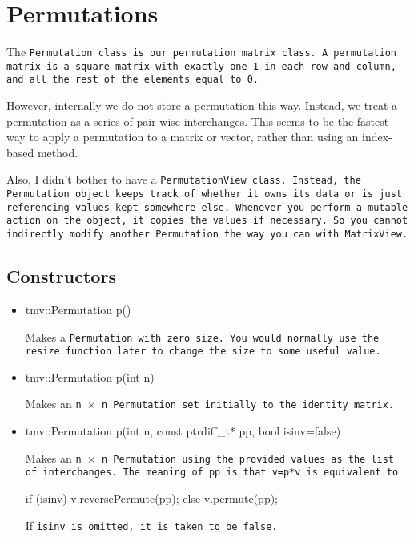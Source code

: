 
\section{Permutations}
\label{Permutation}

The \tt{Permutation} class is our permutation matrix class.
A permutation matrix is a square matrix with exactly one 1 in each row and
column, and all the rest of the elements equal to 0.

However, internally we do not store a permutation this way.
Instead, we treat a permutation as a series of pair-wise interchanges.
This seems to be the fastest way to apply a permutation to a matrix or
vector, rather than using an index-based method.

Also, I didn't bother to have a \tt{PermutationView} class.  Instead, the 
\tt{Permutation} object keeps track of whether it owns its data or is just
referencing values kept somewhere else.  Whenever you perform 
a mutable action on the object, it copies the values if necessary.
So you cannot indirectly modify another \tt{Permutation} the way you can
with \tt{MatrixView}.

\subsection{Constructors}
\label{Permutation_Constructors}

\begin{itemize}

\item
\begin{tmvcode}
tmv::Permutation p()
\end{tmvcode}
Makes a \tt{Permutation} with zero size.  You would normally use the \tt{resize} function later to
change the size to some useful value.

\item 
\begin{tmvcode}
tmv::Permutation p(int n)
\end{tmvcode}
Makes an \tt{n} $\times$ \tt{n} \tt{Permutation} set initially to the identity matrix.

\item
\begin{tmvcode}
tmv::Permutation p(int n, const ptrdiff_t* pp, bool isinv=false)
\end{tmvcode}
Makes an \tt{n} $\times$ \tt{n} \tt{Permutation} using the provided values as the 
list of interchanges.  The meaning of \tt{pp} is that \tt{v=p*v} is equivalent to
\begin{tmvcode}
if (isinv) v.reversePermute(pp);
else v.permute(pp);
\end{tmvcode}
If \tt{isinv} is omitted, it is taken to be \tt{false}.

\end{itemize}


